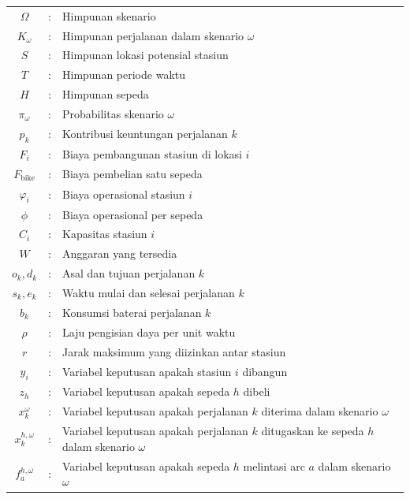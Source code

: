 \documentclass{skripsimathugm}
\begin{document}
\lambang
\begin{tabular}{ccp{10.5cm}}
$\Omega$ &:&  Himpunan skenario\\
$K_\omega$ &:&  Himpunan perjalanan dalam skenario $\omega$\\
$S$ &:&  Himpunan lokasi potensial stasiun\\
$T$ &:&  Himpunan periode waktu\\
$H$ &:&  Himpunan sepeda\\
$\pi_\omega$ &:&  Probabilitas skenario $\omega$\\
$p_k$ &:&  Kontribusi keuntungan perjalanan $k$\\
$F_i$ &:&  Biaya pembangunan stasiun di lokasi $i$\\
$F_{\text{bike}}$ &:&  Biaya pembelian satu sepeda\\
$\varphi_i$ &:&  Biaya operasional stasiun $i$\\
$\phi$ &:&  Biaya operasional per sepeda\\
$C_i$ &:&  Kapasitas stasiun $i$\\
$W$ &:&  Anggaran yang tersedia\\
$o_k, d_k$ &:&  Asal dan tujuan perjalanan $k$\\
$s_k, e_k$ &:&  Waktu mulai dan selesai perjalanan $k$\\
$b_k$ &:&  Konsumsi baterai perjalanan $k$\\
$\rho$ &:&  Laju pengisian daya per unit waktu\\
$r$ &:&  Jarak maksimum yang diizinkan antar stasiun\\
$y_i$ &:&  Variabel keputusan apakah stasiun $i$ dibangun\\
$z_h$ &:&  Variabel keputusan apakah sepeda $h$ dibeli\\
$x_k^\omega$ &:&  Variabel keputusan apakah perjalanan $k$ diterima dalam skenario $\omega$\\
$x_k^{h,\omega}$ &:&  Variabel keputusan apakah perjalanan $k$ ditugaskan ke sepeda $h$ dalam skenario $\omega$\\
$f_a^{h,\omega}$ &:&  Variabel keputusan apakah sepeda $h$ melintasi arc $a$ dalam skenario $\omega$\\
\end{tabular}
\end{document}
